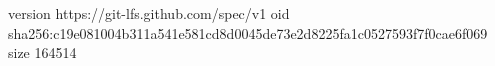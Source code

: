 version https://git-lfs.github.com/spec/v1
oid sha256:c19e081004b311a541e581cd8d0045de73e2d8225fa1c0527593f7f0cae6f069
size 164514
